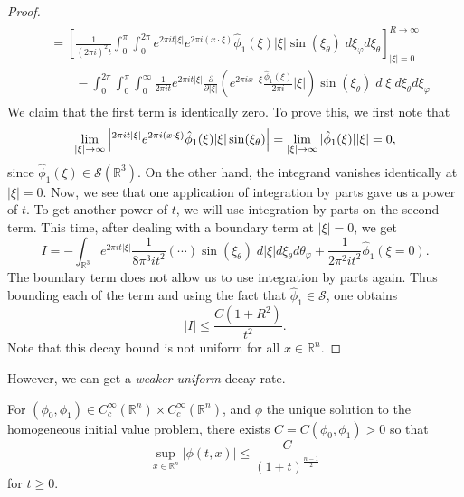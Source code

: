 \documentclass{article}
\numberwithin{equation}{section}
\begin{document}
\begin{proof}
\begin{align*}
\begin{split}
				&= \left[ \frac{1}{(2\pi i)^2 t}\int_0^{\pi}\int_0^{2\pi}e^{2\pi i t |\xi|}e^{2\pi i (x \cdot \xi)}\hat{\phi}_1(\xi) |\xi| \sin(\xi_\theta)\;d\xi_\varphi d\xi_\theta \right]^{R \to \infty}_{|\xi| = 0} \\
				&\qquad - \int_0^{2\pi}\int_0^\pi\int_0^\infty \frac{1}{2\pi i t} e^{2\pi i t|\xi|} \frac{\partial}{\partial |\xi|}\left(e^{2\pi i x \cdot \xi}\frac{\hat{\phi}_1(\xi)}{2\pi i}|\xi|\right)\sin(\xi_\theta)\;d|\xi| d\xi_\theta d\xi_\varphi
			\end{split}
		\end{align*}
		We claim that the first term is identically zero. To prove this, we first note that 
		\begin{equation*}
			\lim_{|\xi|\to \infty}\left| ^{2\pi i t |\xi|}e^{2\pi i (x \cdot \xi)}\hat{\phi}_1(\xi) |\xi| \sin(\xi_\theta) \right| = \lim_{|\xi| \to \infty}|\hat{\phi}_1(\xi)||\xi| = 0, 
		\end{equation*}
		since $\hat{\phi}_1(\xi) \in \mathcal{S}(\mathbb{R}^3)$. On the other hand, the integrand vanishes identically at $|\xi| = 0$. Now, we see that one application of integration by parts gave us a power of $t$. To get another power of $t$, we will use integration by parts on the second term. This time, after dealing with a boundary term at $|\xi| = 0$, we get 
		\begin{equation*}
			I = -\int_{\mathbb{R}^3}e^{2\pi i t|\xi|}\frac{1}{8\pi^3it^2}\left(\dotsm\right)\sin(\xi_\theta)\;d|\xi|d\xi_\theta d\theta_\varphi + \frac{1}{2\pi^2 i t^2}\hat{\phi}_1(\xi = 0). 
		\end{equation*}
		The boundary term does not allow us to use integration by parts again. Thus bounding each of the term and using the fact that $\hat{\phi}_1 \in \mathcal{S}$, one obtains 
		\begin{equation*}
			|I| \leq \frac{C(1 + R^2)}{t^2}. 
		\end{equation*}
		Note that this decay bound is not uniform for all $x \in \mathbb{R}^n$. 
	\end{proof}
	
	However, we can get a \textit{weaker uniform} decay rate. 
	
	\begin{theorem}
		For $(\phi_0, \phi_1) \in C_c^{\infty}(\mathbb{R}^n) \times C_c^{\infty}(\mathbb{R}^n)$, and $\phi$ the unique solution to the homogeneous initial value problem, there exists $C = C(\phi_0, \phi_1) > 0$ so that
		\begin{equation*}
			\sup_{x \in \mathbb{R}^n}|\phi(t,x)| \leq \frac{C}{(1 + t)^{\frac{n-1}{2}}}
		\end{equation*}
		for $t\geq 0$. 
	\end{theorem}
	
\end{document}
